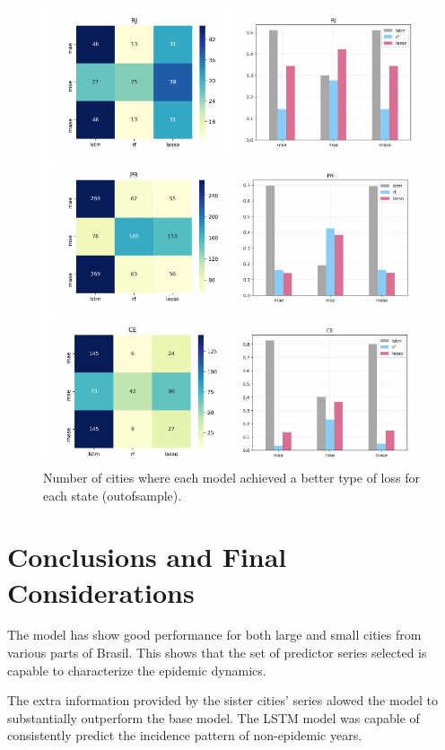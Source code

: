 \documentclass[12pt]{report}
\begin{document}
\begin{figure}
\centering
\includegraphics[width=\textwidth]{loss_count.pdf}
\caption{Number of cities where each model achieved a better type of loss for each state (outofsample).}
\label{fig:losses_heat}
\end{figure}


\newpage
\chapter{Conclusions and Final Considerations}
The model has show good performance for both large and small cities from various parts of Brasil. This shows that the set of predictor series selected is capable to characterize the epidemic dynamics.

The extra information provided by the sister cities' series alowed the model to substantially outperform the base model. The LSTM model was capable of consistently predict the incidence pattern of non-epidemic years. 


\newpage
{}
{}


\end{document}
